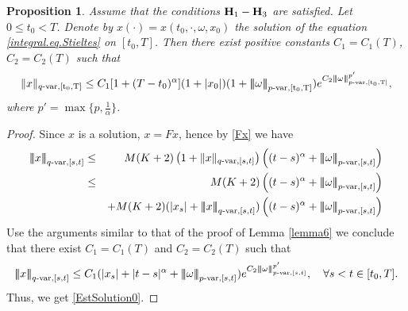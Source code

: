 \documentclass[10pt]{article}
\numberwithin{equation}{section} %
\newcommand{\ltn}{\ensuremath{\left| \! \left| \! \left|}}
\newcommand{\rtn}{\ensuremath{\right| \! \right| \! \right|}}
\newtheorem{proposition}[theorem]{Proposition}
\begin{document}
\begin{proposition}\label{growth}
Assume that the conditions ${\textbf H}_1-{\textbf H}_3$ are satisfied. Let $0\leq t_0<T$. Denote by $x(\cdot)=x(t_0,\cdot,\omega,x_{0})$ the solution of the equation \eqref{integral.eq.Stieltes} on $[t_0,T]$. Then  there exist positive constants $C_1=C_1(T)$, $C_2=C_2(T)$ such that
\begin{eqnarray}\label{EstSolution0}
\| x\|_{q\text{-}\rm{var},[t_0,T]}\leq C_1[1+(T-t_0)^\alpha] (1+|x_0|)(1+\ltn\omega\rtn_{p\text{-}\rm{var},[t_0,T]})e^{C_2\ltn\omega\rtn^{p'}_{p\text{-}\rm{var},[t_0,T]}},
\end{eqnarray}
where $p'=\max\{p,\frac{1}{\alpha}\}$.
\end{proposition}
\begin{proof}
Since $x$ is a solution, $x=Fx$, hence
by \eqref{Fx} we have
\begin{eqnarray*}
\ltn x\rtn_{q\text{-var},[s,t]}&\leq& M(K+2)\left(1+\|x\|_{q\text{-var},[s,t]}\right) \left((t-s)^{\alpha}+\ltn\omega\rtn_{p\text{-var},[s,t]}
\right)\\
&\leq & M(K+2)\left((t-s)^{\alpha}+\ltn\omega\rtn_{p\text{-var},[s,t]}
\right)\\
&& + M(K+2) (|x_s|+\ltn x\rtn_{q\text{-var},[s,t]})\left((t-s)^{\alpha}+\ltn\omega\rtn_{p\text{-var},[s,t]}
\right)
\end{eqnarray*}
Use the arguments similar to that of the proof of Lemma \ref{lemma6}
we conclude that there exist $C_1=C_1(T)$ and $C_2=C_2(T)$ such that
$$\ltn x\rtn_{q\text{-var},[s,t]}\leq C_1 (|x_s|+|t-s|^\alpha+\ltn \omega\rtn_{p\text{-var},[s,t]})e^{C_2\ltn\omega\rtn^{p'}_{p\text{-var},[s,t]}},\quad \forall s<t\in [t_0,T].
$$
Thus, we get \eqref{EstSolution0}.%
\end{proof}
\medskip
\end{document}
